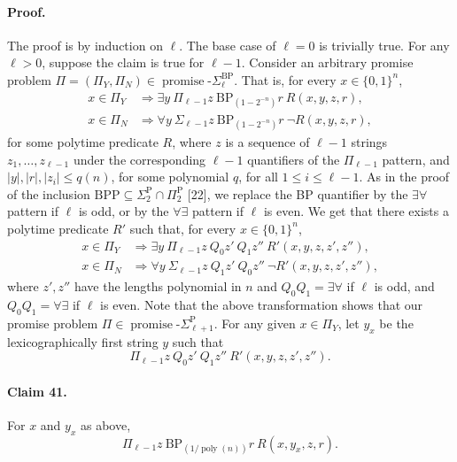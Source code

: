 \paragraph{Proof.} The proof is by induction on $\ell$. The base case of $\ell=0$ is trivially true.
For any $\ell>0$, suppose the claim is true for $\ell-1$. Consider an arbitrary promise problem $\Pi=(\Pi_Y,\Pi_N)\in\operatorname{promise}\text{-}\Sigma_\ell^{\mathrm{BP}}$. That is, for every $x\in\{0,1\}^n$,
\begin{align*}
x\in\Pi_Y&\Longrightarrow\exists y\ \Pi_{\ell-1}z\ \mathrm{BP}_{(1-2^{-n})}r\ R(x,y,z,r),\\
x\in\Pi_N&\Longrightarrow\forall y\ \Sigma_{\ell-1}z\ \mathrm{BP}_{(1-2^{-n})}r\ \neg R(x,y,z,r),
\end{align*}
for some polytime predicate $R$, where $z$ is a sequence of $\ell-1$ strings $z_1,\ldots,z_{\ell-1}$ under the corresponding $\ell-1$ quantifiers of the $\Pi_{\ell-1}$ pattern, and $|y|,|r|,|z_i|\leq q(n)$, for some polynomial $q$, for all $1\leq i\leq\ell-1$.
As in the proof of the inclusion $\mathrm{BPP}\subseteq\Sigma_2^{\mathrm P}\cap\Pi_2^{\mathrm P}$ [22], we replace the BP quantifier by the $\exists\forall$ pattern if $\ell$ is odd, or by the $\forall\exists$ pattern if $\ell$ is even. We get that there exists a polytime predicate $R'$ such that, for every $x\in\{0,1\}^n$,
\begin{align*}
x\in\Pi_Y&\Longrightarrow\exists y\ \Pi_{\ell-1}z\ Q_0z'\ Q_1z''\ R'(x,y,z,z',z''),\\
x\in\Pi_N&\Longrightarrow\forall y\ \Sigma_{\ell-1}z\ Q_1z'\ Q_0z''\ \neg R'(x,y,z,z',z''),
\end{align*}
where $z',z''$ have the lengths polynomial in $n$ and $Q_0Q_1=\exists\forall$ if $\ell$ is odd, and $Q_0Q_1=\forall\exists$ if $\ell$ is even.
Note that the above transformation shows that our promise problem $\Pi\in\operatorname{promise}\text{-}\Sigma_{\ell+1}^{\mathrm P}$. For any given $x\in\Pi_Y$, let $y_x$ be the lexicographically first string $y$ such that
\[\Pi_{\ell-1}z\ Q_0z'\ Q_1z''\ R'(x,y,z,z',z'').\tag{23}\]
\paragraph{Claim 41.} For $x$ and $y_x$ as above,
\[\Pi_{\ell-1}z\ \mathrm{BP}_{(1/\operatorname{poly}(n))}r\ R(x,y_x,z,r).\]
